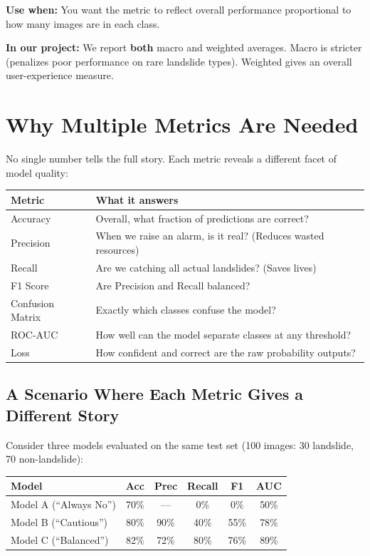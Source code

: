 \documentclass[11pt]{article}
\begin{document}
\noindent\textbf{Use when:} You want the metric to reflect overall performance proportional to how many images are in each class.

\medskip
\noindent\textbf{In our project:} We report \textbf{both} macro and weighted averages.
Macro is stricter (penalizes poor performance on rare landslide types).
Weighted gives an overall user-experience measure.

\section{Why Multiple Metrics Are Needed}

No single number tells the full story. Each metric reveals a different facet of model quality:

\begin{center}
\renewcommand{\arraystretch}{1.3}
\begin{tabularx}{\textwidth}{@{}lX@{}}
\toprule
\textbf{Metric} & \textbf{What it answers} \\ \midrule
Accuracy        & Overall, what fraction of predictions are correct? \\
Precision       & When we raise an alarm, is it real? (Reduces wasted resources) \\
Recall          & Are we catching all actual landslides? (Saves lives) \\
F1 Score        & Are Precision and Recall balanced? \\
Confusion Matrix & Exactly which classes confuse the model? \\
ROC-AUC         & How well can the model separate classes at any threshold? \\
Loss            & How confident and correct are the raw probability outputs? \\
\bottomrule
\end{tabularx}
\end{center}

\subsection{A Scenario Where Each Metric Gives a Different Story}

Consider three models evaluated on the same test set (100 images: 30 landslide, 70 non-landslide):

\begin{center}
\renewcommand{\arraystretch}{1.2}
\begin{tabular}{lccccc}
\toprule
\textbf{Model} & \textbf{Acc} & \textbf{Prec} & \textbf{Recall} & \textbf{F1} & \textbf{AUC} \\
\midrule
Model A (``Always No'')  & 70\% & ---    & 0\%   & 0\%   & 50\% \\
Model B (``Cautious'')   & 80\% & 90\%  & 40\%  & 55\%  & 78\% \\
Model C (``Balanced'')   & 82\% & 72\%  & 80\%  & 76\%  & 89\% \\
\bottomrule
\end{tabular}
\end{center}
\end{document}
